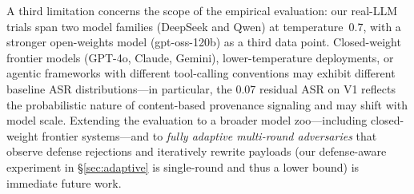 A third limitation concerns the scope of the empirical evaluation: our real-LLM trials span two model families (DeepSeek and Qwen) at temperature~0.7, with a stronger open-weights model (gpt-oss-120b) as a third data point. Closed-weight frontier models (GPT-4o, Claude, Gemini), lower-temperature deployments, or agentic frameworks with different tool-calling conventions may exhibit different baseline ASR distributions---in particular, the 0.07 residual ASR on V1 reflects the probabilistic nature of content-based provenance signaling and may shift with model scale. Extending the evaluation to a broader model zoo---including closed-weight frontier systems---and to \emph{fully adaptive multi-round adversaries} that observe defense rejections and iteratively rewrite payloads (our defense-aware experiment in \S\ref{sec:adaptive} is single-round and thus a lower bound) is immediate future work.
